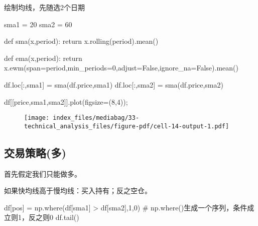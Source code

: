 \documentclass[
  letterpaper,
  DIV=11,
  numbers=noendperiod]{scrreprt}
\newenvironment{Shaded}{\begin{snugshade}}{\end{snugshade}}
\newcommand{\CommentTok}[1]{\textcolor[rgb]{0.37,0.37,0.37}{#1}}
\newcommand{\ControlFlowTok}[1]{\textcolor[rgb]{0.00,0.23,0.31}{#1}}
\newcommand{\DecValTok}[1]{\textcolor[rgb]{0.68,0.00,0.00}{#1}}
\newcommand{\KeywordTok}[1]{\textcolor[rgb]{0.00,0.23,0.31}{#1}}
\newcommand{\NormalTok}[1]{\textcolor[rgb]{0.00,0.23,0.31}{#1}}
\newcommand{\OperatorTok}[1]{\textcolor[rgb]{0.37,0.37,0.37}{#1}}
\newcommand{\StringTok}[1]{\textcolor[rgb]{0.13,0.47,0.30}{#1}}
\newcommand{\VariableTok}[1]{\textcolor[rgb]{0.07,0.07,0.07}{#1}}
\begin{document}
绘制均线，先随选2个日期

\begin{Shaded}
\begin{Highlighting}[]
\NormalTok{sma1 }\OperatorTok{=} \DecValTok{20}
\NormalTok{sma2 }\OperatorTok{=} \DecValTok{60}

\KeywordTok{def}\NormalTok{ sma(x,period):}
    \ControlFlowTok{return}\NormalTok{ x.rolling(period).mean()}

\KeywordTok{def}\NormalTok{ ema(x,period):}
    \ControlFlowTok{return}\NormalTok{ x.ewm(span}\OperatorTok{=}\NormalTok{period,min\_periods}\OperatorTok{=}\DecValTok{0}\NormalTok{,adjust}\OperatorTok{=}\VariableTok{False}\NormalTok{,ignore\_na}\OperatorTok{=}\VariableTok{False}\NormalTok{).mean()}

\NormalTok{df.loc[:,}\StringTok{\textquotesingle{}sma1\textquotesingle{}}\NormalTok{] }\OperatorTok{=}\NormalTok{ sma(df.price,sma1)}
\NormalTok{df.loc[:,}\StringTok{\textquotesingle{}sma2\textquotesingle{}}\NormalTok{] }\OperatorTok{=}\NormalTok{ sma(df.price,sma2)}

\NormalTok{df[[}\StringTok{\textquotesingle{}price\textquotesingle{}}\NormalTok{,}\StringTok{\textquotesingle{}sma1\textquotesingle{}}\NormalTok{,}\StringTok{\textquotesingle{}sma2\textquotesingle{}}\NormalTok{]].plot(figsize}\OperatorTok{=}\NormalTok{(}\DecValTok{8}\NormalTok{,}\DecValTok{4}\NormalTok{))}\OperatorTok{;}
\end{Highlighting}
\end{Shaded}

\begin{figure}[H]

{\centering \texttt{[image: index\_files/mediabag/33-technical\_analysis\_files/figure-pdf/cell-14-output-1.pdf]}

}

\end{figure}

\hypertarget{ux4ea4ux6613ux7b56ux7565ux591a}{%
\subsection{交易策略(多)}\label{ux4ea4ux6613ux7b56ux7565ux591a}}

首先假定我们只能做多。

如果快均线高于慢均线：买入持有；反之空仓。

\begin{Shaded}
\begin{Highlighting}[]
\NormalTok{df[}\StringTok{\textquotesingle{}pos\textquotesingle{}}\NormalTok{] }\OperatorTok{=}\NormalTok{ np.where(df[}\StringTok{\textquotesingle{}sma1\textquotesingle{}}\NormalTok{] }\OperatorTok{\textgreater{}}\NormalTok{ df[}\StringTok{\textquotesingle{}sma2\textquotesingle{}}\NormalTok{],}\DecValTok{1}\NormalTok{,}\DecValTok{0}\NormalTok{) }\CommentTok{\# np.where()生成一个序列，条件成立则1，反之则0}
\NormalTok{df.tail()}
\end{Highlighting}
\end{Shaded}
\end{document}
